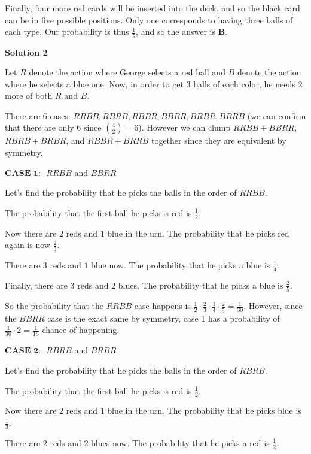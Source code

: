 \begin{enumerate}
 Finally, four more red cards will be inserted into the deck, and so the black card can be in five possible positions. Only one corresponds to having three balls of each type. Our probability is thus $\frac{1}{5}$, and so the answer is $\boxed{\textbf{B}}$.

 



\textbf{Solution 2}

Let $R$ denote the action where George selects a red ball and $B$ denote the action where he selects a blue one. Now, in order to get $3$ balls of each color, he needs $2$ more of both $R$ and $B$.

 There are 6 cases: $RRBB, RBRB, RBBR, BBRR, BRBR, BRRB$ (we can confirm that there are only $6$ since $\binom{4}{2}=6$). However we can clump $RRBB + BBRR$, $RBRB + BRBR$, and $RBBR + BRRB$ together since they are equivalent by symmetry.

 
$\textbf{CASE 1: }$ $RRBB$ and $BBRR$

 Let's find the probability that he picks the balls in the order of $RRBB$. 

 The probability that the first ball he picks is red is $\frac{1}{2}$. 

 Now there are $2$ reds and $1$ blue in the urn. The probability that he picks red again is now $\frac{2}{3}$.

 There are $3$ reds and $1$ blue now. The probability that he picks a blue is $\frac{1}{4}$. 

 Finally, there are $3$ reds and $2$ blues. The probability that he picks a blue is $\frac{2}{5}$.

 So the probability that the $RRBB$ case happens is $\frac{1}{2} \cdot \frac{2}{3} \cdot \frac{1}{4} \cdot \frac{2}{5} = \frac{1}{30}$. However, since the $BBRR$ case is the exact same by symmetry, case 1 has a probability of $\frac{1}{30} \cdot 2 = \frac{1}{15}$ chance of happening.

 
$\textbf{CASE 2: }$ $RBRB$ and $BRBR$

 Let's find the probability that he picks the balls in the order of $RBRB$. 

 The probability that the first ball he picks is red is $\frac{1}{2}$. 

 Now there are $2$ reds and $1$ blue in the urn. The probability that he picks blue is $\frac{1}{3}$.

 There are $2$ reds and $2$ blues now. The probability that he picks a red is $\frac{1}{2}$. 


\end{enumerate}
